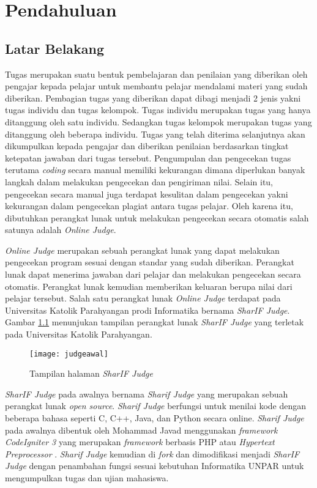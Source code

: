 \chapter{Pendahuluan}
\label{chap:intro}
   
\section{Latar Belakang}
\label{sec:label}

Tugas merupakan suatu bentuk pembelajaran dan penilaian yang diberikan oleh pengajar kepada pelajar untuk membantu pelajar mendalami materi yang sudah diberikan\cite{prihatini:16:plagiarisme}. Pembagian tugas yang diberikan dapat dibagi menjadi 2 jenis yakni tugas individu dan tugas kelompok. Tugas individu merupakan tugas yang hanya ditanggung oleh satu individu. Sedangkan tugas kelompok merupakan tugas yang ditanggung oleh beberapa individu. Tugas yang telah diterima selanjutnya akan dikumpulkan kepada pengajar dan diberikan penilaian berdasarkan tingkat ketepatan jawaban dari tugas tersebut. Pengumpulan dan pengecekan tugas terutama \textit{coding} secara manual memiliki kekurangan dimana diperlukan banyak langkah dalam melakukan pengecekan dan pengiriman nilai. Selain itu, pengecekan secara manual juga terdapat kesulitan dalam pengecekan yakni kekurangan dalam pengecekan plagiat antara tugas pelajar. Oleh karena itu, dibutuhkan perangkat lunak untuk melakukan pengecekan secara otomatis salah satunya adalah \textit{Online Judge}.

\textit{Online Judge} merupakan sebuah perangkat lunak yang dapat melakukan pengecekan program sesuai dengan standar yang sudah diberikan. Perangkat lunak dapat menerima jawaban dari pelajar dan melakukan pengecekan secara otomatis. Perangkat lunak kemudian memberikan keluaran berupa nilai dari pelajar tersebut\cite{kurnia:01:judge}. Salah satu perangkat lunak \textit{Online Judge} terdapat pada Universitas Katolik Parahyangan prodi Informatika bernama \textit{SharIF Judge}. Gambar \ref{fig:judgeawal} menunjukan tampilan perangkat lunak \textit{SharIF Judge} yang terletak pada Universitas Katolik Parahyangan.

\begin{figure}[H]
	\centering  
	\texttt{[image: judgeawal]}  
	\caption[Tampilan halaman \textit{SharIF Judge}]{Tampilan halaman \textit{SharIF Judge}} 
	\label{fig:judgeawal} 
\end{figure} 


\textit{SharIF Judge} pada awalnya bernama \textit{Sharif Judge} yang merupakan sebuah perangkat lunak \textit{open source}. \textit{Sharif Judge} berfungsi untuk menilai kode dengan beberapa bahasa seperti C, C++, Java, dan Python secara online. \textit{Sharif Judge} pada awalnya dibentuk oleh Mohammad Javad menggunakan \textit{framework} \textit{CodeIgniter 3} yang merupakan \textit{framework} berbasis PHP atau \textit{Hypertext Preprocessor} \cite{sharif:23}. \textit{Sharif Judge} kemudian di \textit{fork} dan dimodifikasi menjadi \textit{SharIF Judge} dengan penambahan fungsi sesuai kebutuhan Informatika UNPAR untuk mengumpulkan tugas dan ujian mahasiswa\cite{sharif:23}.

